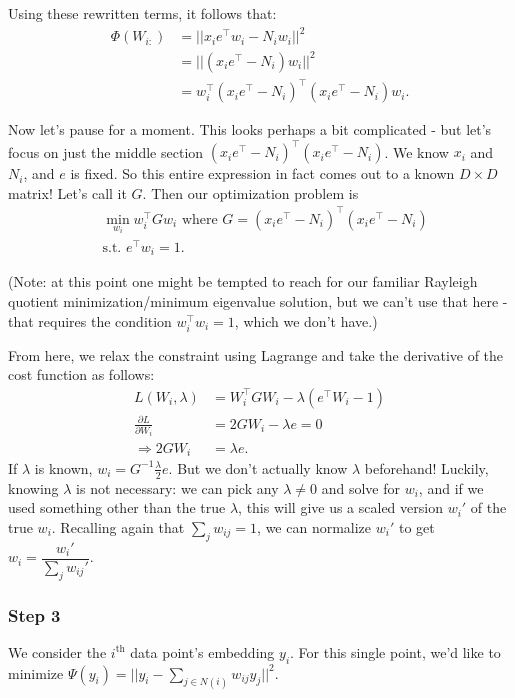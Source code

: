 Using these rewritten terms, it follows that:
\begin{align*}
\Phi (W_{i:})
&= ||x_i e^\intercal w_i - N_i w_i||^2\\
&= ||(x_i e^\intercal-N_i)w_i||^2\\
&= w_i^\intercal (x_i e^\intercal-N_i)^\intercal (x_i e^\intercal - N_i) w_i.
\end{align*}

Now let's pause for a moment. This looks perhaps a bit complicated - but let's focus on just the middle section $(x_i e^\intercal-N_i)^\intercal (x_i e^\intercal - N_i)$. We know $x_i$ and $N_i$, and $e$ is fixed. So this entire expression in fact comes out to a known $D \times D$ matrix! Let's call it $G$. Then our optimization problem is
\begin{align*}
&\min_{w_i} w_i^\intercal G w_i \text{ where } G = (x_i e^\intercal-N_i)^\intercal (x_i e^\intercal - N_i)\\
&\text{s.t. } e^\intercal w_i = 1.
\end{align*}

(Note: at this point one might be tempted to reach for our familiar Rayleigh quotient minimization/minimum eigenvalue solution, but we can't use that here - that requires the condition $w_{i}^\intercal w_i = 1$, which we don't have.)

From here, we relax the constraint using Lagrange and take the derivative of the cost function as follows:
\begin{align*}
L(W_i,\lambda) &= W_i^\intercal G W_i - \lambda (e^\intercal W_i - 1)\\
\frac{\partial L}{\partial W_i} &= 2GW_i - \lambda e = 0\\
\Rightarrow 2GW_i &= \lambda e.
\end{align*}
If $\lambda$ is known, $w_i=G^{-1} \frac{\lambda}{2} e$. But we don't actually know $\lambda$ beforehand! Luckily, knowing $\lambda$ is not necessary: we can pick any $\lambda \neq 0$ and solve for $w_i$, and if we used something other than the true $\lambda$, this will give us a scaled version $w_{i}'$ of the true $w_i$. Recalling again that $\sum_j w_{ij} = 1$, we can normalize $w_{i}'$ to get $w_i = \dfrac{w_{i}'}{\sum_j w_{ij}'}$.

\subsubsection*{Step 3}
We consider the $i^\text{th}$ data point's embedding $y_i$. For this single point, we'd like to minimize $\Psi (y_i)=||y_i-\sum_{j\in N(i)} w_{ij} y_j||^2$.

